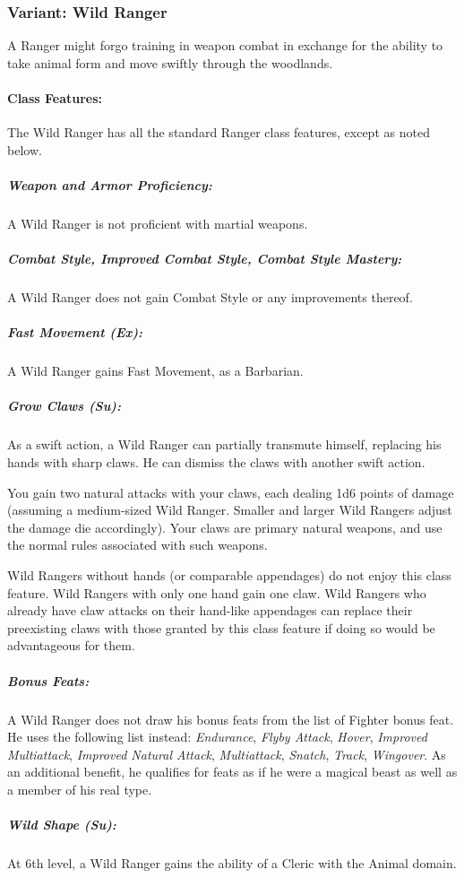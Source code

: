 \subsubsection{Variant: Wild Ranger}

A Ranger might forgo training in weapon combat in exchange for the ability to take animal form and move swiftly through the woodlands.

\paragraph{Class Features:}
The Wild Ranger has all the standard Ranger class features, except as noted below.
\subparagraph{Weapon and Armor Proficiency:} 
A Wild Ranger is not proficient with martial weapons.

\subparagraph{Combat Style, Improved Combat Style, Combat Style Mastery:}
A Wild Ranger does not gain Combat Style or any improvements thereof.

\subparagraph{Fast Movement (Ex):}
A Wild Ranger gains Fast Movement, as a Barbarian.

\subparagraph{Grow Claws (Su):}
As a swift action, a Wild Ranger can partially transmute himself, replacing his hands with sharp claws. He can dismiss the claws with another swift action.

You gain two natural attacks with your claws, each dealing 1d6 points of damage (assuming a medium-sized Wild Ranger. Smaller and larger Wild Rangers adjust the damage die accordingly). Your claws are primary natural weapons, and use the normal rules associated with such weapons.

Wild Rangers without hands (or comparable appendages) do not enjoy this class feature. Wild Rangers with only one hand gain one claw. Wild Rangers who already have claw attacks on their hand-like appendages can replace their preexisting claws with those granted by this class feature if doing so would be advantageous for them.

\subparagraph{Bonus Feats:} A Wild Ranger does not draw his bonus feats from the list of Fighter bonus feat. He uses the following list instead: \emph{Endurance}, \emph{Flyby Attack}, \emph{Hover}, \emph{Improved Multiattack}, \emph{Improved Natural Attack}, \emph{Multiattack}, \emph{Snatch}, \emph{Track}, \emph{Wingover}. As an additional benefit, he qualifies for feats as if he were a magical beast as well as a member of his real type.

\subparagraph{Wild Shape (Su):} At 6th level, a Wild Ranger gains the  ability of a Cleric with the Animal domain.

